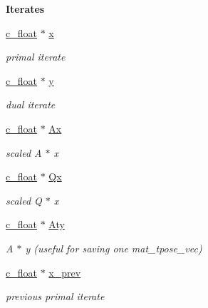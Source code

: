 \begin{Indent}\textbf{ Iterates}\par
\begin{DoxyCompactItemize}
\item 
\mbox{\hyperlink{global__opts_8h_a7f1a9fda95e52979658c20a0d134fb15}{c\+\_\+float}} $\ast$ \mbox{\hyperlink{structQPALMWorkspace_a0625a9b426e5e7d81443a107d49730ef}{x}}
\begin{DoxyCompactList}\small\item\em primal iterate \end{DoxyCompactList}\item 
\mbox{\hyperlink{global__opts_8h_a7f1a9fda95e52979658c20a0d134fb15}{c\+\_\+float}} $\ast$ \mbox{\hyperlink{structQPALMWorkspace_a0d81840f72cdb13574669fc62eb44ac9}{y}}
\begin{DoxyCompactList}\small\item\em dual iterate \end{DoxyCompactList}\item 
\mbox{\hyperlink{global__opts_8h_a7f1a9fda95e52979658c20a0d134fb15}{c\+\_\+float}} $\ast$ \mbox{\hyperlink{structQPALMWorkspace_a34572f3d0c831ab6978808954c80f48c}{Ax}}
\begin{DoxyCompactList}\small\item\em scaled A $\ast$ x \end{DoxyCompactList}\item 
\mbox{\hyperlink{global__opts_8h_a7f1a9fda95e52979658c20a0d134fb15}{c\+\_\+float}} $\ast$ \mbox{\hyperlink{structQPALMWorkspace_a9104271b5dc1b242f3d6d5c175dcb0c1}{Qx}}
\begin{DoxyCompactList}\small\item\em scaled Q $\ast$ x \end{DoxyCompactList}\item 
\mbox{\hyperlink{global__opts_8h_a7f1a9fda95e52979658c20a0d134fb15}{c\+\_\+float}} $\ast$ \mbox{\hyperlink{structQPALMWorkspace_ae807cf93487e8a5e0b658ebdee05a0b1}{Aty}}
\begin{DoxyCompactList}\small\item\em A\textquotesingle{} $\ast$ y (useful for saving one mat\+\_\+tpose\+\_\+vec) \end{DoxyCompactList}\item 
\mbox{\hyperlink{global__opts_8h_a7f1a9fda95e52979658c20a0d134fb15}{c\+\_\+float}} $\ast$ \mbox{\hyperlink{structQPALMWorkspace_a6bd9099b5f7a4008be9eddf61bc1bd13}{x\+\_\+prev}}
\begin{DoxyCompactList}\small\item\em previous primal iterate \end{DoxyCompactList}\end{DoxyCompactItemize}
\end{Indent}
